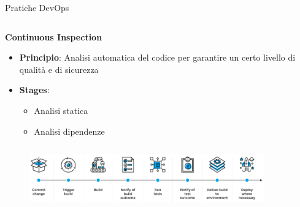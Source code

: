 \begin{frame}{Pratiche DevOps}
\begin{columns}[onlytextwidth,t]
\begin{column}{0.33\textwidth}
            \textbf{Continuous Inspection}
            \vspace{2mm}
            \begin{itemize}
                \item \textbf{Principio}: Analisi automatica del codice per garantire un certo livello di qualità e di sicurezza
                \vspace{2mm}
                \item \textbf{Stages}:
                \begin{itemize}
                    \item Analisi statica
                    \item Analisi dipendenze
                \end{itemize}
            \end{itemize}
        
        \end{column}
    \end{columns}

    \vspace{6mm}

    \begin{figure}[H]
        \includegraphics[width=0.9\textwidth]{img/cicd.png}
    \end{figure}

\end{frame}